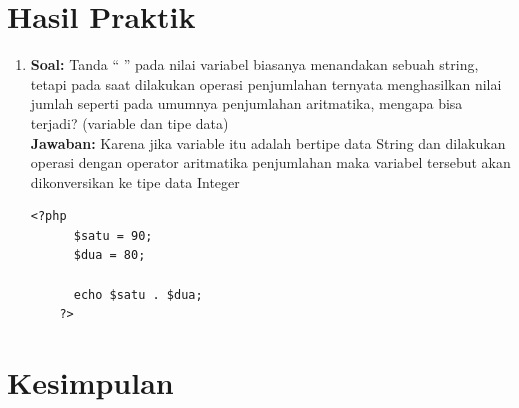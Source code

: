 \documentclass[a4paper]{article}
\begin{document}
\newpage
\section{Hasil Praktik}

\begin{enumerate}
  \item 
  {\bfseries Soal:} Tanda “ ” pada nilai variabel biasanya menandakan sebuah string, tetapi pada saat
  dilakukan operasi penjumlahan ternyata menghasilkan nilai jumlah seperti pada
  umumnya penjumlahan aritmatika, mengapa bisa terjadi? (variable dan tipe data)
  \\
  {\bfseries Jawaban:} Karena jika variable itu adalah bertipe data String dan dilakukan operasi dengan operator aritmatika penjumlahan maka variabel tersebut akan dikonversikan ke tipe data Integer

  \begin{lstlisting}[breaklines=true]
    <?php 
      $satu = 90;
      $dua = 80;

      echo $satu . $dua;
    ?>
  \end{lstlisting}

\end{enumerate}
  \newpage
  \section{Kesimpulan}

  \newpage

  \nocite{bkpm}
  \nocite{wstack}

  \begin{center}
  \printbibliography[heading=bibintoc,title={Daftar Pustaka}]
  \end{center}
\end{document}
